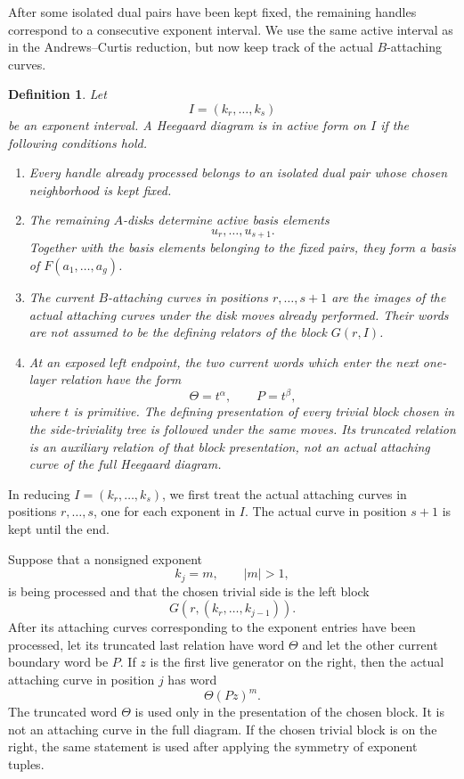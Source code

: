 \documentclass{article}
\newtheorem{df}[theorem]{Definition}
\begin{document}
After some isolated dual pairs have been kept fixed, the remaining handles
correspond to a consecutive exponent interval.  We use the same active
interval as in the Andrews--Curtis reduction, but now keep track of the
actual $B$-attaching curves.

\begin{df}
\label{def:relative-geometric-active-interval}
Let
\[
 I=(k_r,\ldots,k_s)
\]
be an exponent interval.  A Heegaard diagram is in active form on $I$ if the
following conditions hold.

\begin{enumerate}
\item Every handle already processed belongs to an isolated dual pair whose
chosen neighborhood is kept fixed.

\item The remaining $A$-disks determine active basis elements
\[
 u_r,\ldots,u_{s+1}.
\]
Together with the basis elements belonging to the fixed pairs, they form a
basis of $F(a_1,\ldots,a_g)$.

\item The current $B$-attaching curves in positions $r,\ldots,s+1$ are the
images of the actual attaching curves under the disk moves already
performed.  Their words are not assumed to be the defining relators of the
block $G(r,I)$.

\item At an exposed left endpoint, the two current words which enter the
next one-layer relation have the form
\[
 \Theta=t^{\alpha},\qquad P=t^{\beta},
\]
where $t$ is primitive.  The defining presentation of every trivial block
chosen in the side-triviality tree is followed under the same moves.  Its
truncated relation is an auxiliary relation of that block presentation, not
an actual attaching curve of the full Heegaard diagram.
\end{enumerate}
\end{df}

In reducing $I=(k_r,\ldots,k_s)$, we first treat the actual attaching curves
in positions $r,\ldots,s$, one for each exponent in $I$.  The actual curve in
position $s+1$ is kept until the end.

Suppose that a nonsigned exponent
\[
 k_j=m,\qquad |m|>1,
\]
is being processed and that the chosen trivial side is the left block
\[
 G(r,(k_r,\ldots,k_{j-1})).
\]
After its attaching curves corresponding to the exponent entries have been
processed, let its truncated last relation have word $\Theta$ and let the
other current boundary word be $P$.  If $z$ is the first live generator on
the right, then the actual attaching curve in position $j$ has word
\begin{equation}
 \Theta(Pz)^m.
 \label{eq:actual-cut-relation}
\end{equation}
The truncated word $\Theta$ is used only in the presentation of the chosen
block.  It is not an attaching curve in the full diagram.  If the chosen
trivial block is on the right, the same statement is used after applying the
symmetry of exponent tuples.
\end{document}
